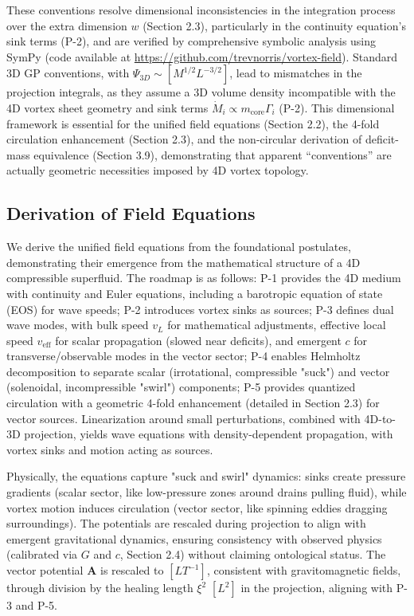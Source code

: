 These conventions resolve dimensional inconsistencies in the integration process over the extra dimension $w$ (Section 2.3), particularly in the continuity equation's sink terms (P-2), and are verified by comprehensive symbolic analysis using SymPy (code available at \url{https://github.com/trevnorris/vortex-field}). Standard 3D GP conventions, with $\Psi_{3D} \sim [M^{1/2} L^{-3/2}]$, lead to mismatches in the projection integrals, as they assume a 3D volume density incompatible with the 4D vortex sheet geometry and sink terms $\dot{M}_i \propto m_{\text{core}} \Gamma_i$ (P-2). This dimensional framework is essential for the unified field equations (Section 2.2), the 4-fold circulation enhancement (Section 2.3), and the non-circular derivation of deficit-mass equivalence (Section 3.9), demonstrating that apparent ``conventions'' are actually geometric necessities imposed by 4D vortex topology.

\subsection{Derivation of Field Equations}

We derive the unified field equations from the foundational postulates, demonstrating their emergence from the mathematical structure of a 4D compressible superfluid. The roadmap is as follows: P-1 provides the 4D medium with continuity and Euler equations, including a barotropic equation of state (EOS) for wave speeds; P-2 introduces vortex sinks as sources; P-3 defines dual wave modes, with bulk speed $v_L$ for mathematical adjustments, effective local speed $v_{\text{eff}}$ for scalar propagation (slowed near deficits), and emergent $c$ for transverse/observable modes in the vector sector; P-4 enables Helmholtz decomposition to separate scalar (irrotational, compressible "suck") and vector (solenoidal, incompressible "swirl") components; P-5 provides quantized circulation with a geometric 4-fold enhancement (detailed in Section 2.3) for vector sources. Linearization around small perturbations, combined with 4D-to-3D projection, yields wave equations with density-dependent propagation, with vortex sinks and motion acting as sources.

Physically, the equations capture "suck and swirl" dynamics: sinks create pressure gradients (scalar sector, like low-pressure zones around drains pulling fluid), while vortex motion induces circulation (vector sector, like spinning eddies dragging surroundings). The potentials are rescaled during projection to align with emergent gravitational dynamics, ensuring consistency with observed physics (calibrated via $G$ and $c$, Section 2.4) without claiming ontological status. The vector potential $\mathbf{A}$ is rescaled to $[L T^{-1}]$, consistent with gravitomagnetic fields, through division by the healing length $\xi^2$ $[L^2]$ in the projection, aligning with P-3 and P-5.

